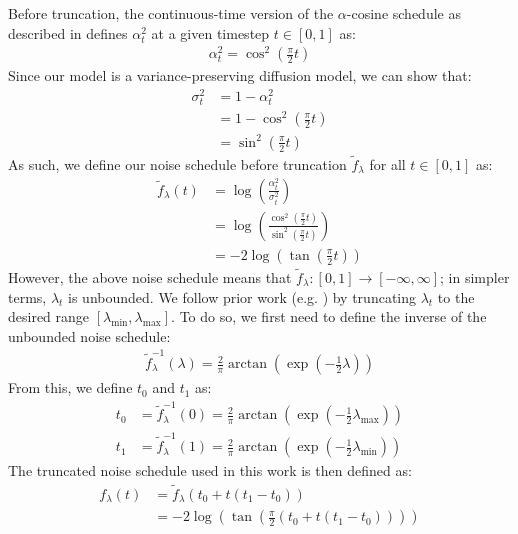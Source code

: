 \documentclass[ oneside,%
                    author={George Herbert},
                    degree={MSci},
                     title={Video Diffusion Models for Climate Simulations},
                  subtitle={}]{dissertation}
\begin{document}
Before truncation, the continuous-time version of the $\alpha$-cosine schedule \cite{IDDPM_Nichol} as described in \cite{Simple_Diffusion_Hoogeboom} defines $\alpha_t^2$ at a given timestep $t\in[0,1]$ as:
\begin{align}
      \alpha_t^2=\cos^2\left(\frac{\pi}{2}t\right)
\end{align}
Since our model is a variance-preserving diffusion model, we can show that:
\begin{align}
      \sigma_t^2&=1-\alpha_t^2\\
      &=1-\cos^2\left(\frac{\pi}{2}t\right)\\
      &=\sin^2\left(\frac{\pi}{2}t\right)
\end{align}
As such, we define our noise schedule before truncation $\tilde{f}_\lambda$ for all $t\in[0,1]$ as:
\begin{align}
      \tilde{f}_\lambda(t)&=\log\left(\frac{\alpha_t^2}{\sigma_t^2}\right)\\
      &=\log\left(\frac{\cos^2\left(\frac{\pi}{2}t\right)}{\sin^2\left(\frac{\pi}{2}t\right)}\right)\\
      &=-2\log\left(\tan\left(\frac{\pi}{2}t\right)\right)
\end{align}
However, the above noise schedule means that $\tilde{f}_\lambda:[0,1]\to[-\infty, \infty]$; in simpler terms, $\lambda_t$ is unbounded. We follow prior work (e.g. \cite{Simple_Diffusion_Hoogeboom,VDM_Ho}) by truncating $\lambda_t$ to the desired range $[\lambda_{\min}, \lambda_{\max}]$. To do so, we first need to define the inverse of the unbounded noise schedule:
\begin{align}
      \tilde{f}_\lambda^{-1}(\lambda)=\frac{2}{\pi}\arctan\left(\exp\left(-\frac{1}{2}\lambda\right)\right)
\end{align}
From this, we define $t_0$ and $t_1$ as:
\begin{align}
      t_0&=\tilde{f}_\lambda^{-1}(0)=\frac{2}{\pi}\arctan\left(\exp\left(-\frac{1}{2}\lambda_{\max}\right)\right)\\
      t_1&=\tilde{f}_\lambda^{-1}(1)=\frac{2}{\pi}\arctan\left(\exp\left(-\frac{1}{2}\lambda_{\min}\right)\right)
\end{align}
The truncated noise schedule used in this work is then defined as:
\begin{align}
      f_\lambda(t)&=\tilde{f}_\lambda(t_0+t(t_1-t_0))\\
      &=-2\log\left(\tan\left(\frac{\pi}{2}(t_0+t(t_1-t_0))\right)\right)
\end{align}
\end{document}
